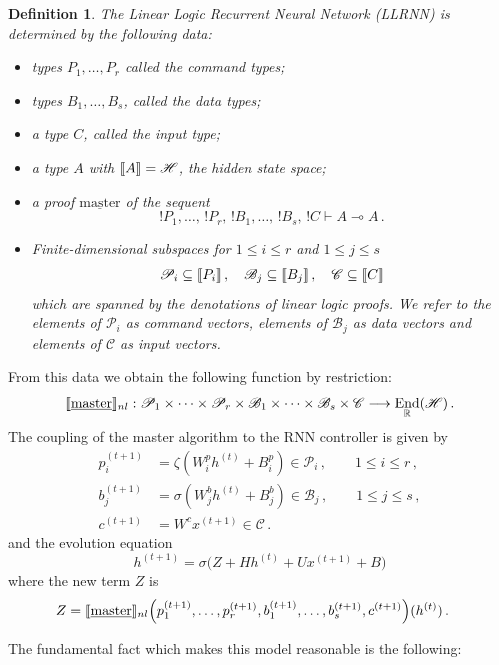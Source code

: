 \documentclass[english,letter paper,12pt,leqno]{article}
\theoremstyle{example}
\newtheorem{definition}[theorem]{Definition}
\numberwithin{equation}{section}
\def\be{\begin{equation}}
\def\ee{\end{equation}}
\DeclareMathOperator{\End}{End}
\begin{document}
\begin{definition} The Linear Logic Recurrent Neural Network (LLRNN) is determined by the following data:
\begin{itemize}
\item types $P_1,\ldots,P_r$ called the \emph{command types};
\item types $B_1,\ldots,B_s$, called the \emph{data types};
\item a type $C$, called the \emph{input type};
\item a type $A$ with $\llbracket A \rrbracket = \mathscr{H}$, the hidden state space;
\item a proof $\underline{\mathrm{master}}$ of the sequent
\be
{!} P_1, \ldots, \, {!}P_r,\, {!} B_1, \ldots,\, {!} B_s,\, {!} C \vdash A \multimap A\,.
\ee
\item Finite-dimensional subspaces for $1 \le i \le r$ and $1 \le j \le s$
\be
\mathscr{P}_i \subseteq \den{P_i}\,, \quad \mathscr{B}_j \subseteq \den{B_j}\,, \quad \mathscr{C} \subseteq \den{C}
\ee
which are spanned by the denotations of linear logic proofs. We refer to the elements of $\mathscr{P}_i$ as \emph{command vectors}, elements of $\mathscr{B}_j$ as \emph{data vectors} and elements of $\mathscr{C}$ as \emph{input vectors}.
\end{itemize}
\end{definition}
From this data we obtain the following function by restriction:
\be
\den{\underline{\mathrm{master}}}_{nl}: \mathscr{P}_1 \times \cdots \times \mathscr{P}_r \times \mathscr{B}_1 \times \cdots \times \mathscr{B}_s \times \mathscr{C} \lto \End_{\mathbb{R}}(\mathscr{H})\,.
\ee
The coupling of the master algorithm to the RNN controller is given by
\begin{align*}
p_i^{(t+1)} &= \zeta( W^p_i h^{(t)} + B^p_i ) \in \mathscr{P}_i\,, \qquad 1 \le i \le r\,,\\
b_j^{(t+1)} &= \sigma( W^b_j h^{(t)} + B^b_j ) \in \mathscr{B}_j\,, \qquad 1 \le j \le s\,,\\
c^{(t+1)} &=  W^c x^{(t+1)} \in \mathscr{C}\,.
\end{align*}
and the evolution equation
\be
h^{(t+1)} = \sigma\Big( Z + H h^{(t)} + U x^{(t+1)} + B\Big)
\ee
where the new term $Z$ is
\begin{align*}
Z &= \llbracket \underline{\mathrm{master}} \rrbracket_{nl}\Big( p_1^{(t+1)}, \ldots, p_r^{(t+1)}, b_1^{(t+1)}, \ldots, b_s^{(t+1)}, c^{(t+1)}\Big)(h^{(t)})\,.
\end{align*}

The fundamental fact which makes this model reasonable is the following:
\end{document}
